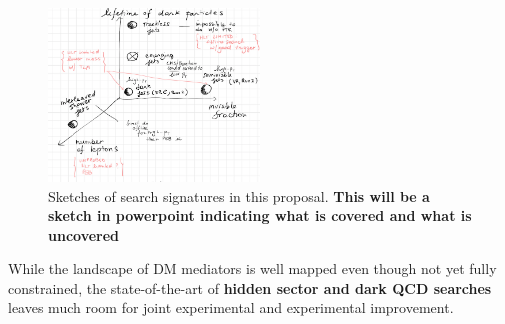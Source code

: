 
\begin{figure} 
\begin{center}
\includegraphics[width=0.5\textwidth]{figs_B2/darksectorsketch.png}
\caption{Sketches of search signatures in this proposal. \color{red}\textbf{This will be a sketch in powerpoint indicating what is covered and what is uncovered}\color{black}\label{fig:darksectorssketch} }
\vskip2pt
\end{center}
\end{figure}
\vskip5pt

 
While the landscape of DM mediators is well mapped even though not yet fully constrained, 
the state-of-the-art of \textbf{hidden sector and dark QCD searches} leaves much room for joint experimental and experimental improvement.

